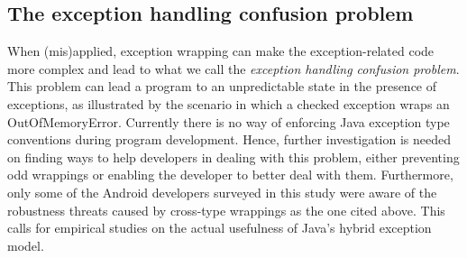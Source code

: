 
\subsection{The exception handling confusion problem}
When (mis)applied, exception wrapping can make the exception-related code
 more complex and lead to what we call the \emph{exception handling confusion problem}.
This problem can lead a program to an unpredictable state in the presence of exceptions,
as illustrated by the scenario in which a checked exception wraps an OutOfMemoryError. 
Currently there is no way of enforcing Java exception type conventions during program development.
Hence, further investigation is needed on finding ways to help developers in dealing with this
 problem, either preventing odd wrappings or enabling the developer to
 better deal with them.
Furthermore, only some of the Android developers surveyed in this study were aware of the 
robustness threats caused by cross-type wrappings as the one cited above. This calls for empirical studies on the actual usefulness of Java's hybrid exception model. 


